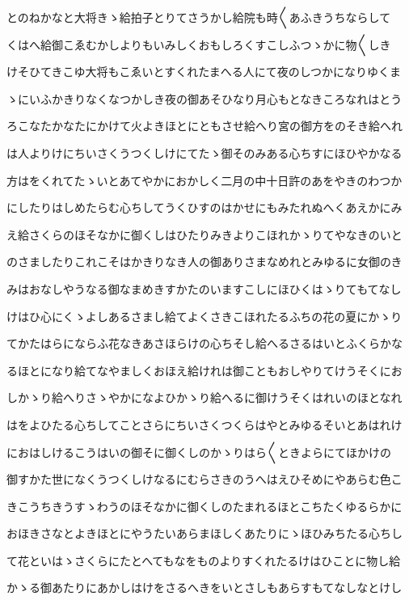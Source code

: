 \documentclass[a4paper,11pt,landscape]{ltjtarticle}
\begin{document}
とのねかなと大将きゝ給拍子とりてさうかし給院も時〱あふきうちならして
\par\medskip
くはへ給御こゑむかしよりもいみしくおもしろくすこしふつゝかに物〱しき
\par\medskip
けそひてきこゆ大将もこゑいとすくれたまへる人にて夜のしつかになりゆくま
\par\medskip
ゝにいふかきりなくなつかしき夜の御あそひなり月心もとなきころなれはとう
\par\medskip
ろこなたかなたにかけて火よきほとにともさせ給へり宮の御方をのそき給へれ
\par\medskip
は人よりけにちいさくうつくしけにてたゝ御そのみある心ちすにほひやかなる
\par\medskip
方はをくれてたゝいとあてやかにおかしく二月の中十日許のあをやきのわつか
\par\medskip
にしたりはしめたらむ心ちしてうくひすのはかせにもみたれぬへくあえかにみ
\par\medskip
え給さくらのほそなかに御くしはひたりみきよりこほれかゝりてやなきのいと
\par\medskip
のさましたりこれこそはかきりなき人の御ありさまなめれとみゆるに女御のき
\par\medskip
みはおなしやうなる御なまめきすかたのいますこしにほひくはゝりてもてなし
\par\medskip
けはひ心にくゝよしあるさまし給てよくさきこほれたるふちの花の夏にかゝり
\par\medskip
てかたはらにならふ花なきあさほらけの心ちそし給へるさるはいとふくらかな
\par\medskip
るほとになり給てなやましくおほえ給けれは御こともおしやりてけうそくにお
\par\medskip
しかゝり給へりさゝやかになよひかゝり給へるに御けうそくはれいのほとなれ
\par\medskip
はをよひたる心ちしてことさらにちいさくつくらはやとみゆるそいとあはれけ
\par\medskip
におはしけるこうはいの御そに御くしのかゝりはら〱ときよらにてほかけの
\par\medskip
御すかた世になくうつくしけなるにむらさきのうへはえひそめにやあらむ色こ
\par\medskip
きこうちきうすゝわうのほそなかに御くしのたまれるほとこちたくゆるらかに
\par\medskip
おほきさなとよきほとにやうたいあらまほしくあたりにゝほひみちたる心ちし
\par\medskip
て花といはゝさくらにたとへてもなをものよりすくれたるけはひことに物し給
\par\medskip
かゝる御あたりにあかしはけをさるへきをいとさしもあらすもてなしなとけし
\end{document}
